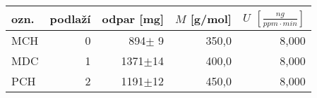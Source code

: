 \begin{tabular}{lrrrr}
\toprule
ozn. & podlaží& odpar [mg] &    $M$ [g/mol] &    $U$ $\left[\si{\frac{ng}{ppm\cdot min}}\right]$\\
\midrule
MCH & 0 &894$\pm$ 9 &  350,0 &  8,000 \\
MDC & 1 &1371$\pm$14 &  400,0 &  8,000 \\
PCH & 2 &1191$\pm$12 &  450,0 &  8,000 \\
\bottomrule
\end{tabular}
